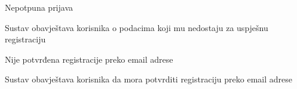 \begin{packed_item}
\begin{packed_item}
\begin{packed_enum}
								\end{packed_enum}
							
							\item[3.c] Nepotpuna prijava \begin{packed_enum}
								
								\item Sustav obavještava korisnika o podacima koji mu nedostaju za uspješnu registraciju
								
								\end{packed_enum}
							
							\item[5.a] Nije potvrđena registracije preko email adrese \begin{packed_enum}
								
								\item Sustav obavještava korisnika da mora potvrditi registraciju preko email adrese
								
							\end{packed_enum}
							
						\end{packed_item}
						
					\end{packed_item}
					
